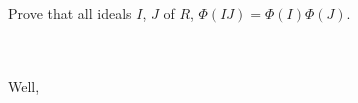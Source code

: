 Prove that all ideals $I$, $J$ of $R$, $\varPhi(IJ)=\varPhi(I)\varPhi(J)$.\\\\

\begin{solution}\renewcommand{\qedsymbol}{}\ \\
    Well,
\end{solution}